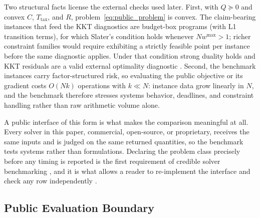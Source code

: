\documentclass[10pt,a4paper]{extarticle}
\begin{document}
Two structural facts license the external checks used later. First, with
$Q \succeq 0$ and convex $C$, $T_{\mathrm{tax}}$, and $R$,
problem~\eqref{eq:public_problem} is convex. The claim-bearing instances
that feed the KKT diagnostics are budget-box programs (with L1 transition
terms), for which Slater's condition holds whenever $N w^{\max} > 1$; richer
constraint families would require exhibiting a strictly feasible point per
instance before the same diagnostic applies. Under that condition strong
duality holds and KKT residuals are a valid external optimality diagnostic
\citep{boydvandenberghe2004}. Second, the
benchmark instances carry factor-structured risk, so evaluating the public
objective or its gradient costs $O(Nk)$ operations with $k \ll N$: instance
data grow linearly in $N$, and the benchmark therefore stresses systems
behavior, deadlines, and constraint handling rather than raw arithmetic
volume alone.

A public interface of this form is what makes the comparison meaningful at
all. Every solver in this paper, commercial, open-source, or proprietary,
receives the same inputs and is judged on the same returned quantities, so
the benchmark tests systems rather than formulations. Declaring the problem
class precisely before any timing is reported is the first requirement of
credible solver benchmarking \citep{bartz2020benchmarking}, and it is what
allows a reader to re-implement the interface and check any row independently
\citep{acmartifact2020}.

\subsection{Public Evaluation Boundary}
\end{document}
